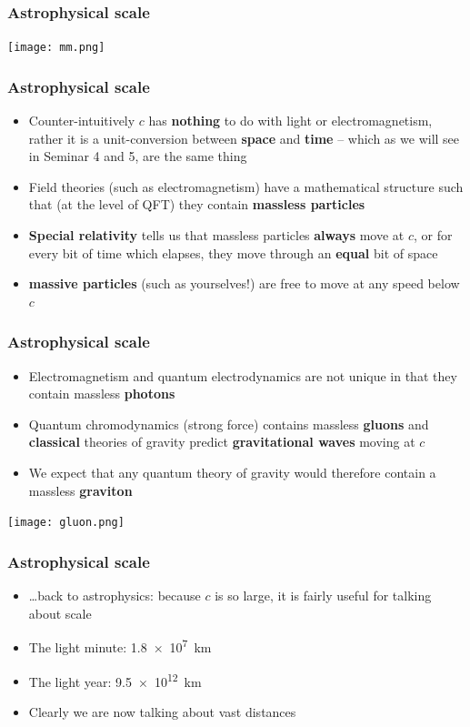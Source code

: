 \documentclass{beamer}
\begin{document}
\begin{frame}
  \frametitle{Astrophysical scale}
  \center
  \texttt{[image: mm.png]}
\end{frame}

\begin{frame}
  \frametitle{Astrophysical scale}
  \begin{itemize}
    \item Counter-intuitively $c$ has \textbf{nothing} to do with light or electromagnetism, rather it is a unit-conversion between \textbf{space} and \textbf{time} -- which as we will see in Seminar 4 and 5, are the same thing
    \item Field theories (such as electromagnetism) have a mathematical structure such that (at the level of QFT) they contain \textbf{massless particles}
    \item \textbf{Special relativity} tells us that massless particles \textbf{always} move at $c$, or for every bit of time which elapses, they move through an \textbf{equal} bit of space
    \item \textbf{massive particles} (such as yourselves!) are free to move at any speed below $c$
  \end{itemize}
\end{frame}

\begin{frame}
  \frametitle{Astrophysical scale}
  \begin{itemize}
    \item Electromagnetism and quantum electrodynamics are not unique in that they contain massless \textbf{photons}
    \item Quantum chromodynamics (strong force) contains massless \textbf{gluons} and \textbf{classical} theories of gravity predict \textbf{gravitational waves} moving at $c$
    \item We expect that any quantum theory of gravity would therefore contain a massless \textbf{graviton}
  \end{itemize}
  \center
  \texttt{[image: gluon.png]}
\end{frame}

\begin{frame}
  \frametitle{Astrophysical scale}
  \begin{itemize}
    \item \ldots back to astrophysics: because $c$ is so large, it is fairly useful for talking about scale
    \item The light minute: \SI{1.8e7}{km}
    \item The light year: \SI{9.5e12}{km}
    \item Clearly we are now talking about vast distances
  \end{itemize}
\end{frame}
\end{document}
